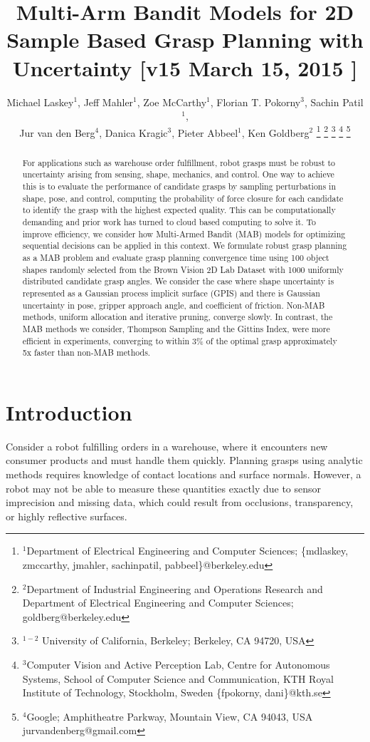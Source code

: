 \documentclass[10pt, conference]{ieeeconf}      %
\title{\LARGE \bf
Multi-Arm Bandit Models for 2D Sample Based Grasp Planning with Uncertainty  [v15 March 15, 2015 ] }
\author{Michael Laskey$^1$, Jeff Mahler$^1$, Zoe McCarthy$^1$,  Florian T. Pokorny$^3$, Sachin Patil$^1$,\\ Jur van den Berg$^4$,  Danica Kragic$^3$, Pieter Abbeel$^1$, Ken Goldberg$^2$%
\thanks{$^1$Department of Electrical Engineering and Computer Sciences; {\small \{mdlaskey, zmccarthy, jmahler, sachinpatil, pabbeel\}@berkeley.edu}}%
\thanks{$^2$Department of Industrial Engineering and Operations Research and Department of Electrical Engineering and Computer Sciences; {\small goldberg@berkeley.edu}}%
\thanks{$^{1-2}$ University of California, Berkeley;  Berkeley, CA 94720, USA}%
\thanks{$^3$Computer Vision and Active Perception Lab, Centre for Autonomous Systems, School of Computer Science and Communication, KTH Royal Institute of Technology, Stockholm, Sweden {\small \{fpokorny, dani\}@kth.se}}%
\thanks{$^4$Google; Amphitheatre Parkway, Mountain View, CA 94043, USA {\small jurvandenberg@gmail.com}}%
}
\begin{document}
\maketitle
\thispagestyle{empty}
\pagestyle{empty}



\begin{abstract}
For applications such as warehouse order fulfillment, robot grasps must be robust to uncertainty arising from sensing, shape, mechanics, and control.  One way to achieve this is to evaluate the performance of candidate grasps by sampling perturbations in shape, pose, and control, computing the probability of force closure for each candidate to identify the grasp with the highest expected quality.  This can be computationally demanding and prior work has turned to cloud based computing to solve it. To improve efficiency, we consider how Multi-Armed Bandit (MAB) models for optimizing sequential decisions can be applied in this context. We formulate robust grasp planning as a MAB problem and evaluate grasp planning convergence time using 100 object shapes randomly selected from the Brown Vision 2D Lab Dataset with 1000 uniformly distributed candidate grasp angles. We consider the case where shape uncertainty is represented as a Gaussian process implicit surface (GPIS) and there is Gaussian uncertainty in pose, gripper approach angle, and coefficient of friction.  Non-MAB methods, uniform allocation and iterative pruning, converge slowly.  In contrast, the MAB methods we consider, Thompson Sampling and the Gittins Index, were more efficient in experiments, converging to within 3\% of the optimal grasp approximately 5x faster than non-MAB methods.
\end{abstract}



\section{Introduction}



Consider a robot fulfilling orders in a warehouse, where it encounters new consumer products and must handle them quickly.
Planning grasps using analytic methods requires knowledge of contact locations and surface normals.
However, a robot may not be able to measure these quantities exactly due to sensor imprecision and missing data, which could result from occlusions, transparency, or highly reflective surfaces. 
\end{document}
